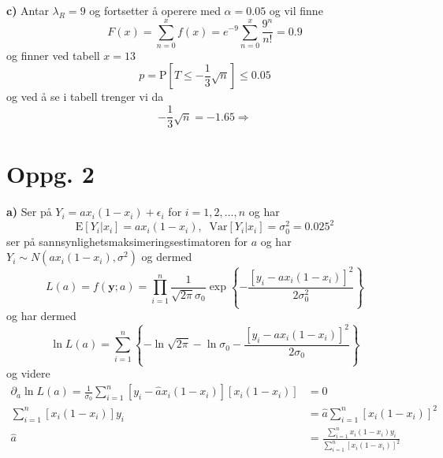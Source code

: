 \documentclass{report}
\newcommand{\bbrack}[1]{\left[ #1 \right]}
\newcommand{\cbrack}[1]{\left\lbrace #1 \right\rbrace}
\newcommand{\Var}[1]{\text{Var} \bbrack{ #1 }}
\newcommand{\fvv}[1]{\text{E} \bbrack{ #1 }}
\newcommand{\Prob}[1]{\text{P} \bbrack{ #1 }}
\begin{document}
\textbf{c)}
Antar $\lambda_{R} = 9$ og fortsetter å operere med $\alpha = 0.05$ og vil finne
\begin{equation}
  \label{eq:13}
  F(x) = \sum_{n=0}^{x} f(x) = e^{-9} \sum_{n=0}^{x} \frac{9^{n}}{n!} = 0.9
\end{equation}
og finner ved tabell $x = 13$
\begin{equation}
  \label{eq:11}
  p = \Prob{ T \leq -\frac{1}{3}\sqrt{n} } \leq 0.05
\end{equation}
og ved å se i tabell trenger vi da
\begin{equation}
  \label{eq:12}
  -\frac{1}{3}\sqrt{n} = -1.65 \Rightarrow
\end{equation}



\section*{Oppg. 2}
\textbf{a)}
Ser på $Y_{i} = ax_{i}(1-x_{i}) + \epsilon_{i}$ for $i = 1, 2, \dots, n$ og har
\begin{equation}
  \label{eq:14}
  \fvv{ Y_{i} | x_{i} } = ax_{i} (1-x_{i}), \;\; \Var{ Y_{i} | x_{i} } = \sigma_{0}^{2} = 0.025^{2}
\end{equation}
ser på sannsynlighetsmaksimeringsestimatoren for $a$ og har $Y_{i} \sim N(ax_{i} (1-x_{i}), \sigma^{2})$ og dermed
\begin{equation}
  \label{eq:15}
  L(a) = f(\mathbf{y};a) = \prod_{i=1}^{n} \frac{1}{\sqrt{2\pi}\sigma_{0}} \exp\cbrack{ -\frac{ \bbrack{ y_{i} - ax_{i} (1-x_{i}) }^{2} }{ 2\sigma_{0}^{2} } }
\end{equation}
og har dermed
\begin{equation}
  \label{eq:10}
  \ln L(a) = \sum_{i=1}^{n} \cbrack{ -\ln \sqrt{2\pi} - \ln \sigma_{0} - \frac{\bbrack{ y_{i} - ax_{i}(1-x_{i}) }^{2}}{2\sigma_{0}} }
\end{equation}
og videre
\begin{equation}
  \label{eq:16}
  \begin{split}
    \partial_{a}\ln L(a) = \frac{1}{\sigma_{0}}\sum_{i=1}^{n} \bbrack{ y_{i} - \widehat{a}x_{i}(1-x_{i}) } \bbrack{x_{i}(1-x_{i})} &= 0 \\
    \sum_{i=1}^{n}\bbrack{x_{i}(1-x_{i})}y_{i} &= \widehat{a}\sum_{i=1}^{n} \bbrack{ x_{i} (1-x_{i}) }^{2} \\
    \widehat{a} &= \frac{\sum_{i=1}^{n} x_{i}(1 - x_{i})y_{i} }{ \sum_{i=1}^{n} \bbrack{ x_{i} (1-x_{i}) }^{2} }
  \end{split}
\end{equation}
\end{document}
